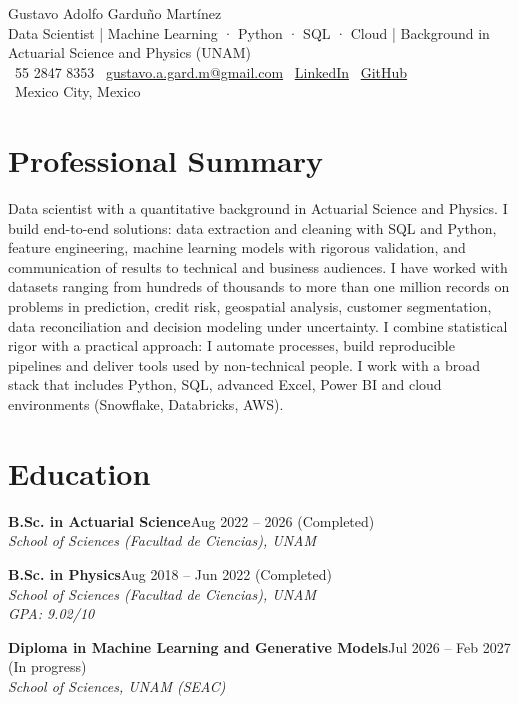 \documentclass[10pt]{article}
\newcommand{\icon}[1]{{\color{gold}#1}}
\newcommand{\entry}[3]{\textbf{#1}\hfill #2\\\textit{#3}\par}
\begin{document}
\begin{center}
{\color{navy}\Huge Gustavo Adolfo Garduño Martínez}\\[3pt]
{\small\color{subtle}Data Scientist | Machine Learning · Python · SQL · Cloud | Background in Actuarial Science and Physics (UNAM)}\\[4pt]
\icon{\faPhone*}~55 2847 8353 \quad
\icon{\faEnvelope}~\href{mailto:gustavo.a.gard.m@gmail.com}{\color{navy}gustavo.a.gard.m@gmail.com} \quad
\icon{\faLinkedin}~\href{https://www.linkedin.com/in/gustavo-adolfo-gardu%C3%B1o-mart%C3%ADnez-881242181/}{\color{navy}LinkedIn} \quad
\icon{\faGithub}~\href{https://github.com/Gustavo-agm}{\color{navy}GitHub}\\
\icon{\faMapMarker*}~Mexico City, Mexico
\end{center}

\section*{Professional Summary}
Data scientist with a quantitative background in Actuarial Science and Physics. I build end-to-end solutions: data extraction and cleaning with SQL and Python, feature engineering, machine learning models with rigorous validation, and communication of results to technical and business audiences. I have worked with datasets ranging from hundreds of thousands to more than one million records on problems in prediction, credit risk, geospatial analysis, customer segmentation, data reconciliation and decision modeling under uncertainty. I combine statistical rigor with a practical approach: I automate processes, build reproducible pipelines and deliver tools used by non-technical people. I work with a broad stack that includes Python, SQL, advanced Excel, Power BI and cloud environments (Snowflake, Databricks, AWS).

\section*{Education}
\entry{B.Sc. in Actuarial Science}{Aug 2022 -- 2026 (Completed)}{School of Sciences (Facultad de Ciencias), UNAM}
\vspace{4pt}
\textbf{B.Sc. in Physics}\hfill Aug 2018 -- Jun 2022 (Completed)\\
\textit{School of Sciences (Facultad de Ciencias), UNAM}\\
\textit{GPA: 9.02/10}\par
\vspace{4pt}
\entry{Diploma in Machine Learning and Generative Models}{Jul 2026 -- Feb 2027 (In progress)}{School of Sciences, UNAM (SEAC)}
\end{document}
